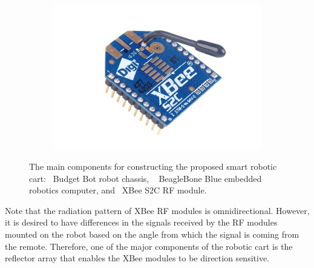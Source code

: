 \documentclass[conference]{IEEEtran}
\begin{document}
\begin{figure}[htbp]
\begin{subfigure}[b]{0.3\linewidth}
    \caption{}
    \label{fig:beagleboneBlue}
  \end{subfigure}
  \begin{subfigure}[b]{0.3\linewidth}
    \includegraphics[width=1\textwidth]{figs/img/Xbee-S2C-Module}
    \caption{}
    \label{fig:xbeemodule}
  \end{subfigure}
  \caption{The main components for constructing the proposed smart robotic cart:~ Budget Bot robot chassis, ~ BeagleBone Blue embedded robotics computer, and~ XBee S2C RF module.}
\end{figure}
%
Note that the radiation pattern of XBee RF modules is omnidirectional. However,
it is desired to have differences in the signals received by the RF modules
mounted on the robot based on the angle from which the signal is coming from the
remote. Therefore, one of the major components of the robotic cart is the
reflector array that enables the XBee modules to be direction sensitive.
\end{document}
